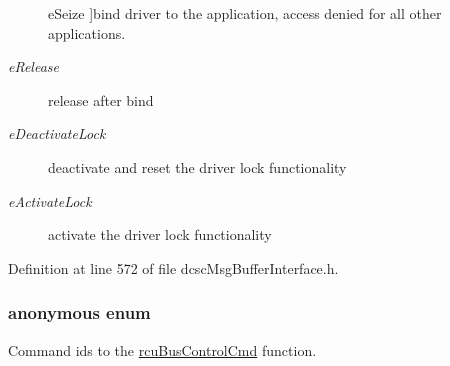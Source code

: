 \begin{Desc}
\begin{description}
{{e\-Seize}
\label{group__dcsc__msg__buffer__access_ggbed82baf7f470b522273a3e37c24c6001391714f3c5c8e7738e9b0e871dc3cce}
}]bind driver to the application, access denied for all other applications. \item[{\em 
\hypertarget{group__dcsc__msg__buffer__access_ggbed82baf7f470b522273a3e37c24c6001349887513e044eb25dceda6bc2c9429}{
e\-Release}
\label{group__dcsc__msg__buffer__access_ggbed82baf7f470b522273a3e37c24c6001349887513e044eb25dceda6bc2c9429}
}]release after bind \item[{\em 
\hypertarget{group__dcsc__msg__buffer__access_ggbed82baf7f470b522273a3e37c24c600be8853084b74223aab7a0a0c8150eb5a}{
e\-Deactivate\-Lock}
\label{group__dcsc__msg__buffer__access_ggbed82baf7f470b522273a3e37c24c600be8853084b74223aab7a0a0c8150eb5a}
}]deactivate and reset the driver lock functionality \item[{\em 
\hypertarget{group__dcsc__msg__buffer__access_ggbed82baf7f470b522273a3e37c24c60052e15b8bac21d0241661e3caf289e745}{
e\-Activate\-Lock}
\label{group__dcsc__msg__buffer__access_ggbed82baf7f470b522273a3e37c24c60052e15b8bac21d0241661e3caf289e745}
}]activate the driver lock functionality \end{description}
\end{Desc}



Definition at line 572 of file dcsc\-Msg\-Buffer\-Interface.h.\hypertarget{group__dcsc__msg__buffer__access_gb04a0655cd1e3bcac5e8f48c18df1a57}{
\subsubsection["@9]{\setlength{\rightskip}{0pt plus 5cm}anonymous enum}}
\label{group__dcsc__msg__buffer__access_gb04a0655cd1e3bcac5e8f48c18df1a57}


Command ids to the \hyperlink{group__dcsc__msg__buffer__access_gf74b29f8ded2feb57974c95e4863eac8}{rcu\-Bus\-Control\-Cmd} function. 

